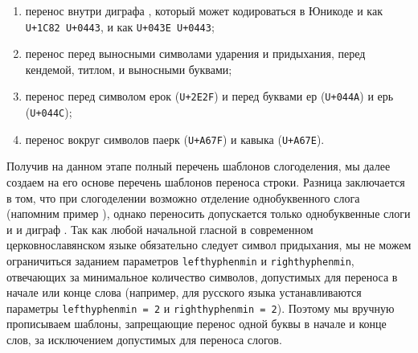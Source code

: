 \documentclass[12pt,a4paper,oneside]{extarticle}
\begin{document}
\begin{enumerate}
\item перенос внутри диграфа , который может кодироваться в Юникоде и как \verb!U+1C82 U+0443!, и как 
\verb!U+043E U+0443!;
\item перенос перед выносными символами ударения и придыхания, перед кендемой, титлом, и выносными буквами\autocite[Полный перечень с
имволов вместе с их кодовыми точками в Юникоде, а также полный перечень возможных слов с титлом или буквенными титлами см. в 
работе ][]{utn41};
\item перенос перед символом ерок (\verb!U+2E2F!) и перед буквами ер (\verb!U+044A!) и ерь (\verb!U+044C!);
\item перенос вокруг символов паерк (\verb!U+A67F!) и кавыка (\verb!U+A67E!).
\end{enumerate}

Получив на данном этапе полный перечень шаблонов слогоделения, мы далее создаем на его основе перечень шаблонов переноса строки. Разница 
заключается в том, что при слогоделении возможно отделение однобуквенного слога (напомним пример ), однако 
переносить допускается только однобуквенные слоги  и  и диграф . 
Так как любой начальной гласной в современном церковнославянском языке обязательно следует символ придыхания, мы не можем ограничиться 
заданием параметров \verb+lefthyphenmin+ и \verb+righthyphenmin+, отвечающих за минимальное количество символов, допустимых для переноса 
в начале или конце слова (например, для русского языка устанавливаются параметры \verb+lefthyphenmin = 2+ и \verb+righthyphenmin = 2+). 
Поэтому мы вручную прописываем шаблоны, запрещающие перенос одной буквы в начале и конце слов, за исключением допустимых для переноса 
слогов.
\end{document}
